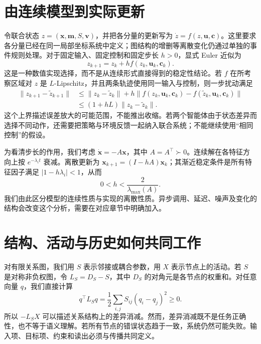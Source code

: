 \section*{由连续模型到实际更新}
令联合状态 $z=(\mathbf{x},\mathbf{m},S,\mathbf{v})$，并把各分量的更新写为 $\dot z=f(z,\mathbf{u},\mathbf{c})$。这里要求各分量已经在同一局部坐标系统中定义；图结构的增删等离散变化仍通过单独的事件规则处理。对于固定输入、固定控制和固定步长 $h>0$，显式 Euler 近似为
\begin{equation}
 z_{k+1}=z_k+h f(z_k,\mathbf{u}_k,\mathbf{c}_k).
\end{equation}
这是一种数值实现选择，而不是从连续形式直接得到的稳定性结论。若 $f$ 在所考察区域对 $z$ 是 $L$-Lipschitz，并且两条轨迹使用同一输入与控制，则一步扰动满足
\begin{align}
 \|z_{k+1}-\widetilde z_{k+1}\|
 &\leq \|z_k-\widetilde z_k\|
       +h\|f(z_k,\mathbf{u}_k,\mathbf{c}_k)
           -f(\widetilde z_k,\mathbf{u}_k,\mathbf{c}_k)\|\\
 &\leq (1+hL)\|z_k-\widetilde z_k\|.
\end{align}
这个上界描述误差放大的可能范围，不能推出收缩。若两个智能体由于状态差异而选择不同动作，还需要把策略与环境反馈一起纳入联合系统；不能继续使用“相同控制”的假设。

为看清步长的作用，我们考虑 $\dot{\mathbf{x}}=-A\mathbf{x}$，其中 $A=A^\top\succ0$。连续解在各特征方向上按 $e^{-\lambda_i t}$ 衰减。离散更新为 $\mathbf{x}_{k+1}=(I-hA)\mathbf{x}_k$；其渐近稳定条件是所有特征因子满足 $|1-h\lambda_i|<1$，从而
\begin{equation}
 0<h<\frac{2}{\lambda_{\max}(A)}.
\end{equation}
我们由此区分模型的连续性质与实现的离散性质。异步调用、延迟、噪声及变化的结构会改变这个分析，需要在对应章节中明确加入。

\section*{结构、活动与历史如何共同工作}
对有限关系图，我们用 $S$ 表示邻接或耦合参数，用 $X$ 表示节点上的活动。若 $S$ 是对称非负权图，令 $L_S=D_S-S$，其中 $D_S$ 的对角元是各节点的权重和。对任意向量 $q$，我们直接计算
\begin{equation}
 q^\top L_S q=\frac12\sum_{i,j}S_{ij}(q_i-q_j)^2\geq0.
\end{equation}
所以 $-L_S X$ 可以描述关系结构上的差异消减。然而，差异消减既不是任务正确性，也不等于语义理解。若所有节点的错误状态趋于一致，系统仍然可能失败。输入项、目标项、约束和读出必须与传播共同定义。

